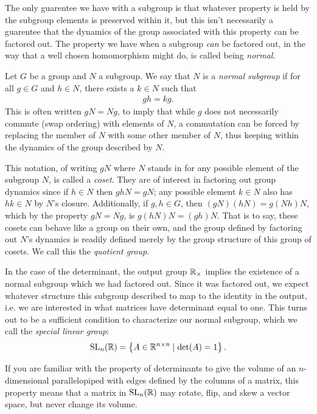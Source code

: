 \documentclass[11pt]{article}
\begin{document}
The only guarentee we have with a subgroup is that whatever property is held by the subgroup elements is preserved within it, but this isn't necessarily a guarentee that the dynamics of the group associated with this property can be factored out. The property we have when a subgroup \emph{can} be factored out, in the way that a well chosen homomorphism might do, is called being \emph{normal}.

\begin{definition}
Let $G$ be a group and $N$ a subgroup. We say that $N$ is a \emph{normal subgroup} if for all $g \in G$ and $h \in N$, there exists a $k \in N$ such that \begin{gather*}
gh = kg.
\end{gather*}
This is often written $gN = Ng$, to imply that while $g$ does not necessarily commute (swap ordering) with elements of $N$, a commutation can be forced by replacing the member of $N$ with some other member of $N$, thus keeping within the dynamics of the group described by $N$. 
\end{definition}

This notation, of writing $gN$ where $N$ stands in for any possible element of the subgroup $N$, is called a \emph{coset}. They are of interest in factoring out group dynamics since if $h\in N$ then $ghN = gN$; any possible element $k\in N$ also has $hk \in N$ by $N$'s closure. Additionally, if $g,h \in G$, then $(gN)(hN) = g(Nh)N$, which by the property $gN=Ng$, is $g(hN)N = (gh)N$. That is to say, these cosets can behave like a group on their own, and the group defined by factoring out $N$'s dynamics is readily defined merely by the group structure of this group of cosets. We call this the \emph{quotient group}.

In the case of the determinant, the output group $\mathbb{R}_\times$ implies the existence of a normal subgroup which we had factored out. Since it was factored out, we expect whatever structure this subgroup described to map to the identity in the output, i.e. we are interested in what matrices have determinant equal to one. This turns out to be a sufficient condition to characterize our normal subgroup, which we call the \emph{special linear group}: \begin{gather*}
\mathrm{SL}_n(\mathbb{R}) = \left\{ A \in \mathbb{R}^{n \times n} \mid \det(A) = 1 \right\}.
\end{gather*}

If you are familiar with the property of determinants to give the volume of an $n$-dimensional parallelopiped with edges defined by the columns of a matrix, this property means that a matrix in $\mathrm{SL}_n(\mathbb{R})$ may rotate, flip, and skew a vector space, but never change its volume.
\end{document}
